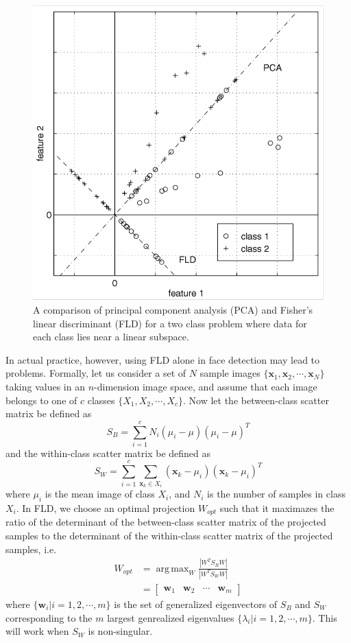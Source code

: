 \documentclass[10pt,twocolumn,letterpaper]{article}
\DeclareMathOperator*{\argmax}{arg\,max}
\newcommand{\xvec}{\mathbf{x}}
\newcommand{\wvec}{\mathbf{w}}
\begin{document}
\begin{figure}[t]
\begin{center}
  \includegraphics[width=0.8\linewidth]{fish-eigen-comparison.png}
  \caption{A comparison of principal component analysis (PCA) and Fisher’s linear discriminant (FLD) for a two class problem where data for each class lies near a linear subspace. \cite{Article06}}
  \label{fig:fish-eigen-comparison}
\end{center}
\end{figure}

In actual practice, however, using FLD alone in face detection may lead to problems. Formally, let us consider a set of $N$ sample images $\{\xvec_1, \xvec_2, \cdots, \xvec_N\}$ taking values in an $n$-dimension image space, and assume that each image belongs to one of $c$ classes $\{X_1, X_2, \cdots, X_c\}$. Now let the between-class scatter matrix be defined as
\[S_B = \sum\limits_{i = 1}^c N_i(\mu_i - \mu)(\mu_i - \mu)^T\]
and the within-class scatter matrix be defined as
\[S_W = \sum\limits_{i = 1}^c \sum\limits_{\xvec_k \in X_i} (\xvec_k - \mu_i)(\xvec_k - \mu_i)^T\]
where $\mu_i$ is the mean image of class $X_i$, and $N_i$ is the number of samples in class $X_i$. In FLD, we choose an optimal projection $W_{opt}$ such that it maximazes the ratio of the determinant of the between-class scatter matrix of the projected samples to the determinant of the within-class scatter matrix of the projected samples, i.e.
\begin{align*}
    W_{opt} &= \argmax_W \frac{|W^T S_B W|}{|W^T S_W W|} \\
    &= \begin{bmatrix}\wvec_1 & \wvec_2 & \cdots & \wvec_m\end{bmatrix}
\end{align*}
where $\{\wvec_i | i = 1, 2, \cdots, m\}$ is the set of generalized eigenvectors of $S_B$ and $S_W$ corresponding to the $m$ largest genrealized eigenvalues $\{\lambda_i | i = 1, 2, \cdots, m\}$. This will work when $S_W$ is non-singular. 
\end{document}
